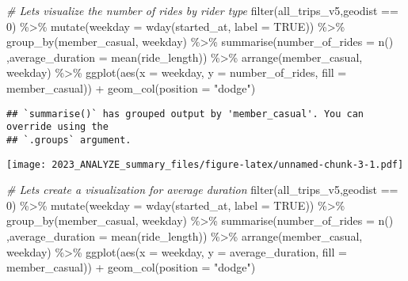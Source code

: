 \documentclass[
]{article}
\newenvironment{Shaded}{\begin{snugshade}}{\end{snugshade}}
\newcommand{\AttributeTok}[1]{\textcolor[rgb]{0.77,0.63,0.00}{#1}}
\newcommand{\CommentTok}[1]{\textcolor[rgb]{0.56,0.35,0.01}{\textit{#1}}}
\newcommand{\ConstantTok}[1]{\textcolor[rgb]{0.00,0.00,0.00}{#1}}
\newcommand{\DecValTok}[1]{\textcolor[rgb]{0.00,0.00,0.81}{#1}}
\newcommand{\FunctionTok}[1]{\textcolor[rgb]{0.00,0.00,0.00}{#1}}
\newcommand{\NormalTok}[1]{#1}
\newcommand{\SpecialCharTok}[1]{\textcolor[rgb]{0.00,0.00,0.00}{#1}}
\newcommand{\StringTok}[1]{\textcolor[rgb]{0.31,0.60,0.02}{#1}}
\begin{document}
\begin{Shaded}
\begin{Highlighting}[]
\CommentTok{\# Let\textquotesingle{}s visualize the number of rides by rider type}
\FunctionTok{filter}\NormalTok{(all\_trips\_v5,geodist }\SpecialCharTok{==} \DecValTok{0}\NormalTok{) }\SpecialCharTok{\%\textgreater{}\%} 
  \FunctionTok{mutate}\NormalTok{(}\AttributeTok{weekday =} \FunctionTok{wday}\NormalTok{(started\_at, }\AttributeTok{label =} \ConstantTok{TRUE}\NormalTok{)) }\SpecialCharTok{\%\textgreater{}\%} 
  \FunctionTok{group\_by}\NormalTok{(member\_casual, weekday) }\SpecialCharTok{\%\textgreater{}\%} 
  \FunctionTok{summarise}\NormalTok{(}\AttributeTok{number\_of\_rides =} \FunctionTok{n}\NormalTok{()}
\NormalTok{            ,}\AttributeTok{average\_duration =} \FunctionTok{mean}\NormalTok{(ride\_length)) }\SpecialCharTok{\%\textgreater{}\%} 
  \FunctionTok{arrange}\NormalTok{(member\_casual, weekday)  }\SpecialCharTok{\%\textgreater{}\%} 
  \FunctionTok{ggplot}\NormalTok{(}\FunctionTok{aes}\NormalTok{(}\AttributeTok{x =}\NormalTok{ weekday, }\AttributeTok{y =}\NormalTok{ number\_of\_rides, }\AttributeTok{fill =}\NormalTok{ member\_casual)) }\SpecialCharTok{+}
  \FunctionTok{geom\_col}\NormalTok{(}\AttributeTok{position =} \StringTok{"dodge"}\NormalTok{)}
\end{Highlighting}
\end{Shaded}

\begin{verbatim}
## `summarise()` has grouped output by 'member_casual'. You can override using the
## `.groups` argument.
\end{verbatim}

\texttt{[image: 2023\_ANALYZE\_summary\_files/figure-latex/unnamed-chunk-3-1.pdf]}

\begin{Shaded}
\begin{Highlighting}[]
\CommentTok{\# Let\textquotesingle{}s create a visualization for average duration}
\FunctionTok{filter}\NormalTok{(all\_trips\_v5,geodist }\SpecialCharTok{==} \DecValTok{0}\NormalTok{) }\SpecialCharTok{\%\textgreater{}\%} 
  \FunctionTok{mutate}\NormalTok{(}\AttributeTok{weekday =} \FunctionTok{wday}\NormalTok{(started\_at, }\AttributeTok{label =} \ConstantTok{TRUE}\NormalTok{)) }\SpecialCharTok{\%\textgreater{}\%} 
  \FunctionTok{group\_by}\NormalTok{(member\_casual, weekday) }\SpecialCharTok{\%\textgreater{}\%} 
  \FunctionTok{summarise}\NormalTok{(}\AttributeTok{number\_of\_rides =} \FunctionTok{n}\NormalTok{()}
\NormalTok{            ,}\AttributeTok{average\_duration =} \FunctionTok{mean}\NormalTok{(ride\_length)) }\SpecialCharTok{\%\textgreater{}\%} 
  \FunctionTok{arrange}\NormalTok{(member\_casual, weekday)  }\SpecialCharTok{\%\textgreater{}\%} 
  \FunctionTok{ggplot}\NormalTok{(}\FunctionTok{aes}\NormalTok{(}\AttributeTok{x =}\NormalTok{ weekday, }\AttributeTok{y =}\NormalTok{ average\_duration, }\AttributeTok{fill =}\NormalTok{ member\_casual)) }\SpecialCharTok{+}
  \FunctionTok{geom\_col}\NormalTok{(}\AttributeTok{position =} \StringTok{"dodge"}\NormalTok{)}
\end{Highlighting}
\end{Shaded}
\end{document}
